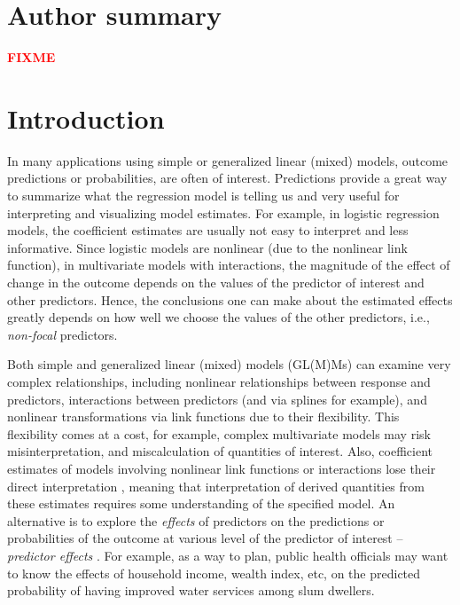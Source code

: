 \documentclass[10pt,letterpaper]{article}
\newcommand{\fix}{{\bf \textcolor{red}{FIXME}}}
\begin{document}
\section*{Author summary}

\fix

\linenumbers

\section*{Introduction}

In many applications using simple or generalized linear (mixed) models, outcome predictions or probabilities, are often of interest. Predictions provide a great way to summarize what the regression model is telling us and very useful for interpreting and visualizing model estimates. For example, in logistic regression models, the coefficient estimates are usually not easy to interpret and less informative. Since logistic models are nonlinear (due to the nonlinear link function), in multivariate models with interactions, the magnitude of the effect of change in the outcome depends on the values of the predictor of interest and other predictors. Hence, the conclusions one can make about the estimated effects greatly depends on how well we choose the values of the other predictors, i.e., \emph{non-focal} predictors.  

Both simple and generalized linear (mixed) models (GL(M)Ms) can examine very complex relationships, including nonlinear relationships between response and predictors, interactions between predictors (and via splines for example), and nonlinear transformations via link functions due to their flexibility. This flexibility comes at a cost, for example, complex multivariate models may risk misinterpretation, and miscalculation of quantities of interest. Also, coefficient estimates of models involving nonlinear link functions or interactions lose their direct interpretation \cite{leeper2017interpreting}, meaning that interpretation of derived quantities from these estimates requires some understanding of the specified model. An alternative is to explore the \emph{effects} of predictors on the predictions or probabilities of the outcome at various level of the predictor of interest -- \emph{predictor effects} \cite{fox2009effect, leeper2017package, lenth2018package}. For example, as a way to plan, public health officials may want to know the effects of household income, wealth index, etc, on the predicted probability of having improved water services among slum dwellers.
\end{document}

